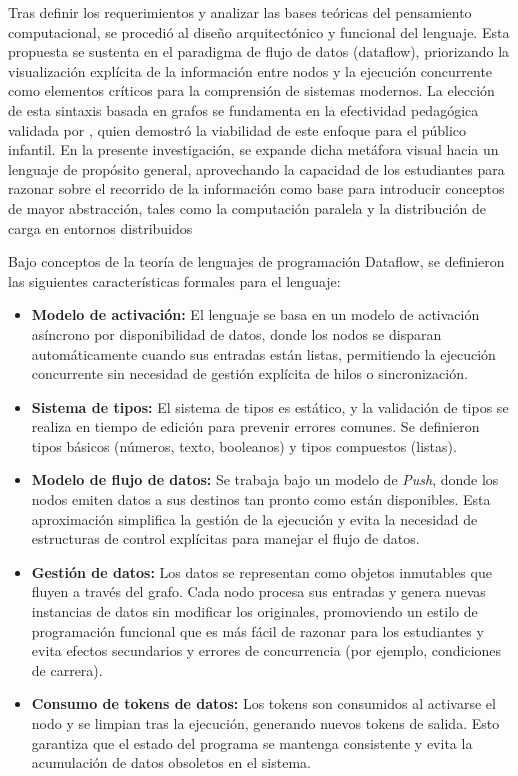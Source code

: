 
Tras definir los requerimientos y analizar las bases teóricas del pensamiento computacional, se procedió al diseño arquitectónico y funcional del lenguaje. Esta propuesta se sustenta en el paradigma de flujo de datos (dataflow), priorizando la visualización explícita de la información entre nodos y la ejecución concurrente como elementos críticos para la comprensión de sistemas modernos. La elección de esta sintaxis basada en grafos se fundamenta en la efectividad pedagógica validada por , quien demostró la viabilidad de este enfoque para el público infantil. En la presente investigación, se expande dicha metáfora visual hacia un lenguaje de propósito general, aprovechando la capacidad de los estudiantes para razonar sobre el recorrido de la información como base para introducir conceptos de mayor abstracción, tales como la computación paralela y la distribución de carga en entornos distribuidos


Bajo conceptos de la teoría de lenguajes de programación Dataflow, se definieron las siguientes características formales para el lenguaje:

\begin{itemize}
    \item \textbf{Modelo de activación:} El lenguaje se basa en un modelo de activación asíncrono por disponibilidad de datos, donde los nodos se disparan automáticamente cuando sus entradas están listas, permitiendo la ejecución concurrente sin necesidad de gestión explícita de hilos o sincronización.
    \item \textbf{Sistema de tipos:} El sistema de tipos es estático, y la validación de tipos se realiza en tiempo de edición para prevenir errores comunes. Se definieron tipos básicos (números, texto, booleanos) y tipos compuestos (listas).
    \item \textbf{Modelo de flujo de datos:} Se trabaja bajo un modelo de \emph{Push}, donde los nodos emiten datos a sus destinos tan pronto como están disponibles. Esta aproximación simplifica la gestión de la ejecución y evita la necesidad de estructuras de control explícitas para manejar el flujo de datos.
    \item \textbf{Gestión de datos:} Los datos se representan como objetos inmutables que fluyen a través del grafo. Cada nodo procesa sus entradas y genera nuevas instancias de datos sin modificar los originales, promoviendo un estilo de programación funcional que es más fácil de razonar para los estudiantes y evita efectos secundarios y errores de concurrencia (por ejemplo, condiciones de carrera).
    \item \textbf{Consumo de tokens de datos:} Los tokens son consumidos al activarse el nodo y se limpian tras la ejecución, generando nuevos tokens de salida. Esto garantiza que el estado del programa se mantenga consistente y evita la acumulación de datos obsoletos en el sistema.
\end{itemize}

